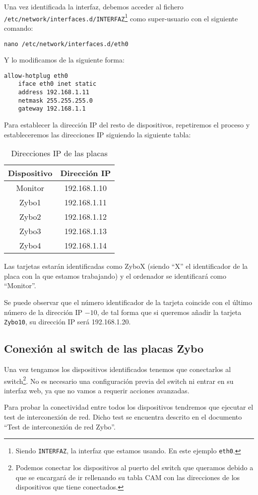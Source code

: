 \documentclass[12pt,letterpaper]{article}
\begin{document}
Una vez identificada la interfaz, debemos acceder al fichero\\ \texttt{/etc/network/interfaces.d/INTERFAZ}\footnote{Siendo \texttt{INTERFAZ}, la interfaz que estamos usando. En este ejemplo \texttt{eth0}.} como super-usuario con el siguiente comando:
\begin{center}
	\texttt{nano /etc/network/interfaces.d/eth0}
\end{center}
Y lo modificamos de la siguiente forma:
\begin{lstlisting}
allow-hotplug eth0
    iface eth0 inet static
    address 192.168.1.11
    netmask 255.255.255.0
    gateway 192.168.1.1
\end{lstlisting}
\newpage
Para establecer la dirección IP del resto de dispositivos, repetiremos el proceso y estableceremos las direcciones IP siguiendo la siguiente tabla:
\begin{table}[h]
	\centering
	\begin{tabular}{|c|c|}
		\hline
		\textbf{Dispositivo} & \textbf{Dirección IP} \\ \hline
		Monitor & 192.168.1.10 \\ \hline
		Zybo1 & 192.168.1.11 \\ \hline
		Zybo2 & 192.168.1.12 \\ \hline
		Zybo3 & 192.168.1.13 \\ \hline
		Zybo4 & 192.168.1.14 \\ \hline
	\end{tabular}
\caption{Direcciones IP de las placas}
\label{Direcciones IP de las placas}
\end{table}

Las tarjetas estarán identificadas como ZyboX (siendo ``X'' el identificador de la placa con la que estamos trabajando) y el ordenador se identificará como ``Monitor''.

Se puede observar que el número identificador de la tarjeta coincide con el último número de la dirección IP $- 10$, de tal forma que si queremos añadir la tarjeta \texttt{Zybo10}, su dirección IP será 192.168.1.20.

\subsection{Conexión al switch de las placas Zybo}
Una vez tengamos los dispositivos identificados tenemos que conectarlos al switch\footnote{Podemos conectar los dispositivos al puerto del switch que queramos debido a que se encargará de ir rellenando su tabla CAM con las direcciones de los dispositivos que tiene conectados.}. No es necesario una configuración previa del switch ni entrar en su interfaz web, ya que no vamos a requerir acciones avanzadas.

Para probar la conectividad entre todos los dispositivos tendremos que ejecutar el test de interconexión de red. Dicho test se encuentra descrito en el documento ``Test de interconexión de red Zybo''.
\end{document}
